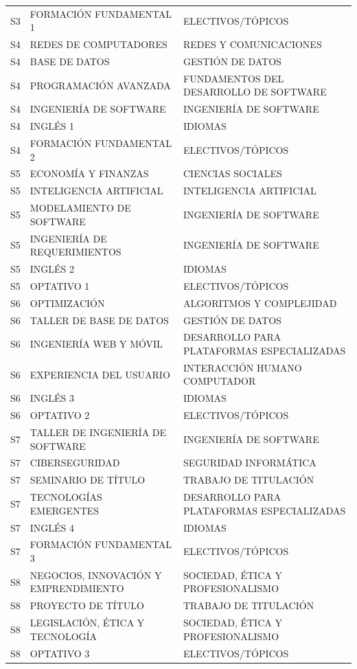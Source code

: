 \documentclass[11pt,a4paper]{article}
\begin{document}
\begin{small}
\begin{longtable}{c >{\raggedright\arraybackslash}p{8.5cm} >{\raggedright\arraybackslash}p{5.5cm}}
S3 & FORMACIÓN FUNDAMENTAL 1 & ELECTIVOS/TÓPICOS \\
S4 & REDES DE COMPUTADORES & REDES Y COMUNICACIONES \\
S4 & BASE DE DATOS & GESTIÓN DE DATOS \\
S4 & PROGRAMACIÓN AVANZADA & FUNDAMENTOS DEL DESARROLLO DE SOFTWARE \\
S4 & INGENIERÍA DE SOFTWARE & INGENIERÍA DE SOFTWARE \\
S4 & INGLÉS 1 & IDIOMAS \\
S4 & FORMACIÓN FUNDAMENTAL 2 & ELECTIVOS/TÓPICOS \\
S5 & ECONOMÍA Y FINANZAS & CIENCIAS SOCIALES \\
S5 & INTELIGENCIA ARTIFICIAL & INTELIGENCIA ARTIFICIAL \\
S5 & MODELAMIENTO DE SOFTWARE & INGENIERÍA DE SOFTWARE \\
S5 & INGENIERÍA DE REQUERIMIENTOS & INGENIERÍA DE SOFTWARE \\
S5 & INGLÉS 2 & IDIOMAS \\
S5 & OPTATIVO 1 & ELECTIVOS/TÓPICOS \\
S6 & OPTIMIZACIÓN & ALGORITMOS Y COMPLEJIDAD \\
S6 & TALLER DE BASE DE DATOS & GESTIÓN DE DATOS \\
S6 & INGENIERÍA WEB Y MÓVIL & DESARROLLO PARA PLATAFORMAS ESPECIALIZADAS \\
S6 & EXPERIENCIA DEL USUARIO & INTERACCIÓN HUMANO COMPUTADOR \\
S6 & INGLÉS 3 & IDIOMAS \\
S6 & OPTATIVO 2 & ELECTIVOS/TÓPICOS \\
S7 & TALLER DE INGENIERÍA DE SOFTWARE & INGENIERÍA DE SOFTWARE \\
S7 & CIBERSEGURIDAD & SEGURIDAD INFORMÁTICA \\
S7 & SEMINARIO DE TÍTULO & TRABAJO DE TITULACIÓN \\
S7 & TECNOLOGÍAS EMERGENTES & DESARROLLO PARA PLATAFORMAS ESPECIALIZADAS \\
S7 & INGLÉS 4 & IDIOMAS \\
S7 & FORMACIÓN FUNDAMENTAL 3 & ELECTIVOS/TÓPICOS \\
S8 & NEGOCIOS, INNOVACIÓN Y EMPRENDIMIENTO & SOCIEDAD, ÉTICA Y PROFESIONALISMO \\
S8 & PROYECTO DE TÍTULO & TRABAJO DE TITULACIÓN \\
S8 & LEGISLACIÓN, ÉTICA Y TECNOLOGÍA & SOCIEDAD, ÉTICA Y PROFESIONALISMO \\
S8 & OPTATIVO 3 & ELECTIVOS/TÓPICOS \\
\end{longtable}
\end{small}
\end{document}
